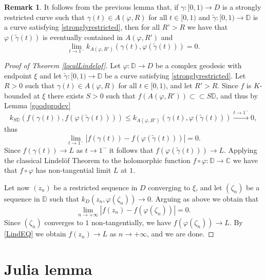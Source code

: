 \documentclass[11pt, reqno]{amsart}
\numberwithin{equation}{section}
\theoremstyle{definition}
\newtheorem{remark}[theorem]{Remark}
\newcommand{\C}{\mathbb{C}}
\newcommand{\D}{\mathbb{D}}
\begin{document}
{{{		\begin{remark}It follows from the previous lemma that, if $\gamma\colon[0,1)\to D$ is a strongly restricted curve such that $\gamma(t)\in A(\varphi,R)$ for all $t\in[0,1)$ and $\tilde{\gamma}\colon[0,1)\to\D$  is a curve satisfying \eqref{stronglyrestricted}, then for all $R'>R$ we have that 
			$\varphi(\tilde\gamma(t))$ is eventually contained in $A(\varphi,R')$ and
			$$\lim_{t\to 1^-}k_{A(\varphi,R')}(\gamma(t),\varphi(\tilde\gamma(t)))=0.$$
		\end{remark}
		
		\begin{proof}[Proof of Theorem \ref{localLindelof}]
			Let  $\varphi\colon \D\to D$ be a complex geodesic with endpoint $\xi$ and 
			let $\tilde \gamma\colon[0,1)\to \D$ be a curve satisfying \eqref{stronglyrestricted}.
			Let $R>0$ such that $\gamma(t)\in A(\varphi,R)$ for all $t\in[0,1)$, and 	let $R'>R$. 
			Since $f$ is $K$-bounded at $\xi$ there exists $S>0$ such that $f(A(\varphi,R'))\subset\subset S\D$, and thus by Lemma \ref{goodprodev}
			$$k_{S\D}(f(\gamma(t)),f(\varphi(\tilde\gamma(t))))\leq k_{A(\varphi,R')}(\gamma(t),\varphi(\tilde \gamma(t)))\stackrel{t\to 1^-}\longrightarrow 0,$$ 
			thus
			$$
			\lim_{t\to1^-}|f(\gamma(t))-f(\varphi(\tilde \gamma(t)))|=0.
			$$
			Since $f(\gamma(t))\to L$ as $t\to 1^-$ it follows that $f(\varphi(\tilde \gamma(t)))\to L$. Applying the classical Lindel\"{o}f Theorem to the holomorphic function $f\circ\varphi\colon \D\to \C$ we have that $f\circ\varphi$ has non-tangential limit $L$ at $1$.
			
			
			
			Let now $(z_n)$ be a  restricted sequence in $D$ converging to $\xi$, and let  $(\zeta_n)$ be a sequence in $\D$ such that 
			$k_D(z_n,\varphi(\zeta_n))\to 0.$
			Arguing as above we obtain that 
			\begin{equation}\label{LindEQ}
				\lim_{n\to+\infty}|f(z_n)-f(\varphi(\zeta_n))|=0.
			\end{equation}
			Since  $(\zeta_n)$ converges to $1$ non-tangentially, we have  $f(\varphi(\zeta_n))\to L$. By \eqref{LindEQ} we obtain $f(z_n)\to L$ as $n\to+\infty$, and we are done.
		\end{proof}
		
		
		
		
		
		
		
		\section{Julia lemma}\label{Julia}
		
}}}
\end{document}
